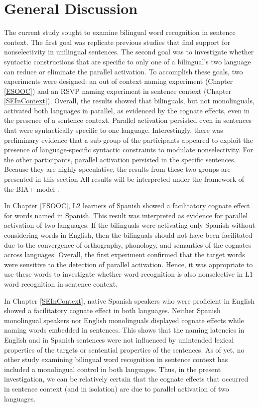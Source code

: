 \chapter{General Discussion}
The current study sought to examine bilingual word recognition in sentence context. The first goal was replicate previous studies that find support for nonselectivity in unilingual sentences. The second goal was to investigate whether syntactic constructions that are specific to only one of a bilingual's two language can reduce or eliminate the parallel activation. To accomplish these goals, two experiments were designed: an out of context naming experiment (Chapter \ref{ESOOC}) and an RSVP naming experiment in sentence context (Chapter \ref{SEInContext}). Overall, the results showed that bilinguals, but not monolinguals, activated both languages in parallel, as evidenced by the cognate effects, even in the presence of a sentence context.  Parallel activation persisted even in  sentences that  were syntactically specific to one language. Interestingly, there was preliminary evidence that a sub-group of the participants appeared to exploit the presence of language-specific syntactic constraints to modulate nonselectivity. For the other participants, parallel activation persisted in the specific sentences. Because they are highly speculative, the results from these two groups are presented in this section  All results will be interpreted under the framework of the BIA+ model \parencite[][]{Dijkstra2002}.

In Chapter \ref{ESOOC}, L2 learners of Spanish showed a facilitatory cognate effect for words named in Spanish. This result was interpreted as evidence for parallel activation of two languages. If the bilinguals were activating only Spanish without considering words in English, then the bilinguals should not have been facilitated due to the convergence of orthography,  phonology, and semantics of the cognates across languages. Overall, the first experiment confirmed that the target words were sensitive to the detection of parallel activation. Hence, it was appropriate to use these words to investigate whether word recognition is also nonselective in L1 word recognition in sentence context. 

In Chapter \ref{SEInContext}, native Spanish speakers who were proficient in English showed a facilitatory cognate effect in both languages. Neither  Spanish monolingual speakers nor English monolinguals displayed cognate effects while naming words embedded in sentences. This shows that the naming  latencies in English and in Spanish sentences were not influenced by unintended  lexical properties of the targets or sentential properties of the sentences. As of yet, no other study examining bilingual word recognition in sentence context has included a monolingual control in both languages. Thus, in the present investigation, we can be relatively certain that the cognate effects that occurred in sentence context (and in isolation) are due to parallel activation of two languages.

